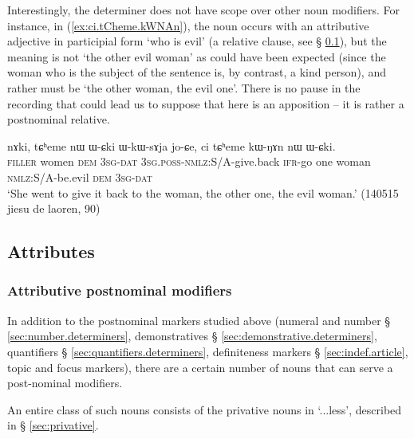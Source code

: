 Interestingly, the determiner  does not have scope over other noun modifiers. For instance, in (\ref{ex:ci.tCheme.kWNAn}), the noun  occurs with an attributive adjective in participial form  `who is evil' (a relative clause, see § \ref{sec:attributes}), but the meaning is not `the other evil woman' as could have been expected (since the woman who is the subject of the sentence is, by contrast, a kind person), and rather must be `the other woman, the evil one'. There is no pause in the recording that could lead us to suppose that  here is an apposition -- it is rather a postnominal relative.

\begin{exe}
\ex \label{ex:ci.tCheme.kWNAn}
\gll nɤki, tɕʰeme nɯ ɯ-ɕki ɯ-kɯ-sɤja jo-ɕe, ci tɕʰeme kɯ-ŋɤn nɯ ɯ-ɕki. \\
\textsc{filler} women \textsc{dem} \textsc{3sg}-\textsc{dat} \textsc{3sg}.\textsc{poss}-\textsc{nmlz}:S/A-give.back \textsc{ifr}-go one woman \textsc{nmlz}:S/A-be.evil \textsc{dem} \textsc{3sg}-\textsc{dat} \\
\glt `She went to give it back to the woman, the other one, the evil woman.' (140515 jiesu de laoren, 90)
\end{exe}


\subsection{Attributes} \label{sec:attributes}
\subsubsection{Attributive postnominal modifiers} \label{ex:attributive.postnominal}
In addition to the postnominal markers studied above (numeral and number § \ref{sec:number.determiners}, demonstratives § \ref{sec:demonstrative.determiners}, quantifiers § \ref{sec:quantifiers.determiners}, definiteness markers § \ref{sec:indef.article}, topic and focus markers), there are a certain number of nouns that can serve a post-nominal modifiers.

An entire class of such nouns consists of the privative nouns in  `...less', described in § \ref{sec:privative}.

